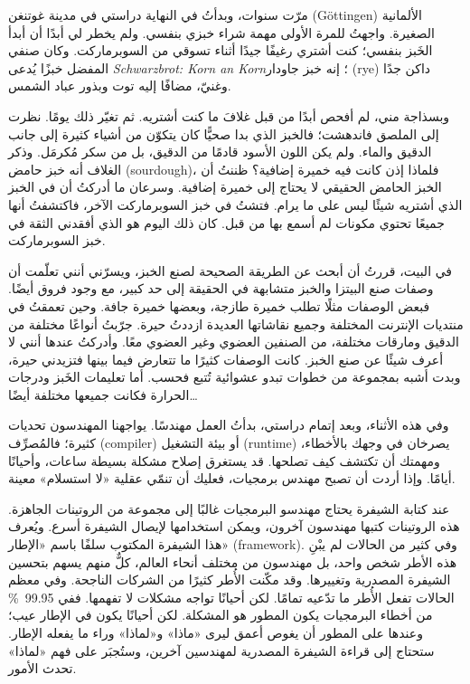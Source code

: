 مرّت سنوات، وبدأتُ في النهاية دراستي في مدينة غوتنغن
\textenglish{(Göttingen)} الألمانية الصغيرة. واجهتُ للمرة الأولى مهمة
شراء خبزي بنفسي. ولم يخطر لي أبدًا أن أبدأ الخَبز بنفسي؛ كنت أشتري
رغيفًا جيدًا أثناء تسوقي من السوبرماركت. وكان صنفي المفضل خبزًا يُدعى
\textenglish{\emph{Schwarzbrot: Korn an Korn}}؛ إنه خبز جاودار
\textenglish{(rye)} داكن جدًا وغنيّ، مضافًا إليه توت وبذور عباد الشمس.

وبسذاجة مني، لم أفحص أبدًا من قبل غلافَ ما كنت أشتريه. ثم تغيّر ذلك
يومًا. نظرت إلى الملصق فاندهشت؛ فالخبز الذي بدا صحيًّا كان يتكوّن من
أشياء كثيرة إلى جانب الدقيق والماء. ولم يكن اللون الأسود قادمًا من
الدقيق، بل من سكر مُكرمَل. وذكر الغلاف أنه خبز حامض \textenglish{(sourdough)}،
فلماذا إذن كانت فيه خميرة إضافية؟ ظننتُ أن الخبز الحامض الحقيقي لا يحتاج
إلى خميرة إضافية. وسرعان ما أدركتُ أن في الخبز الذي أشتريه شيئًا ليس على
ما يرام. فتشتُ في خبز السوبرماركت الآخر، فاكتشفتُ أنها جميعًا تحتوي
مكونات لم أسمع بها من قبل. كان ذلك اليوم هو الذي أفقدني الثقة في خبز
السوبرماركت.

في البيت، قررتُ أن أبحث عن الطريقة الصحيحة لصنع الخبز، ويسرّني أنني
تعلّمت أن وصفات صنع البيتزا والخبز متشابهة في الحقيقة إلى حد كبير، مع
وجود فروق أيضًا. فبعض الوصفات مثلًا تطلب خميرة طازجة، وبعضها خميرة جافة.
وحين تعمقتُ في منتديات الإنترنت المختلفة وجميع نقاشاتها العديدة ازددتُ
حيرة. جرّبتُ أنواعًا مختلفة من الدقيق ومارقات مختلفة، من الصنفين العضوي
وغير العضوي معًا. وأدركتُ عندها أنني لا أعرف شيئًا عن صنع الخبز. كانت
الوصفات كثيرًا ما تتعارض فيما بينها فتزيدني حيرة، وبدت أشبه بمجموعة من
خطوات تبدو عشوائية تُتبع فحسب. أما تعليمات الخَبز ودرجات الحرارة فكانت
جميعها مختلفة أيضًا\ldots

وفي هذه الأثناء، وبعد إتمام دراستي، بدأتُ العمل مهندسًا. يواجهنا
المهندسون تحديات كثيرة؛ فالمُصرِّف \textenglish{(compiler)} أو بيئة
التشغيل \textenglish{(runtime)} يصرخان في وجهك بالأخطاء، ومهمتك أن
تكتشف كيف تصلحها. قد يستغرق إصلاح مشكلة بسيطة ساعات، وأحيانًا أيامًا.
وإذا أردت أن تصبح مهندس برمجيات، فعليك أن تنمّي عقلية «لا استسلام»
معينة.

عند كتابة الشيفرة يحتاج مهندسو البرمجيات غالبًا إلى مجموعة من الروتينات
الجاهزة. هذه الروتينات كتبها مهندسون آخرون، ويمكن استخدامها لإيصال
الشيفرة أسرع. ويُعرف هذا الشيفرة المكتوب سلفًا باسم «الإطار»
\textenglish{(framework)}. وفي كثير من الحالات لم يبْنِ هذه الأطر شخص
واحد، بل مهندسون من مختلف أنحاء العالم، كلٌّ منهم يسهم بتحسين الشيفرة
المصدرية وتغييرها. وقد مكّنت الأُطر كثيرًا من الشركات الناجحة. وفي معظم
الحالات تفعل الأُطر ما تدّعيه تمامًا. لكن أحيانًا تواجه مشكلات لا
تفهمها. ففي \qty{99.95}{\percent} من أخطاء البرمجيات يكون المطور هو
المشكلة. لكن أحيانًا يكون في الإطار عيب؛ وعندها على المطور أن يغوص أعمق
ليرى «ماذا» و«لماذا» وراء ما يفعله الإطار. ستحتاج إلى قراءة الشيفرة
المصدرية لمهندسين آخرين، وستُجبَر على فهم «لماذا» تحدث الأمور.

